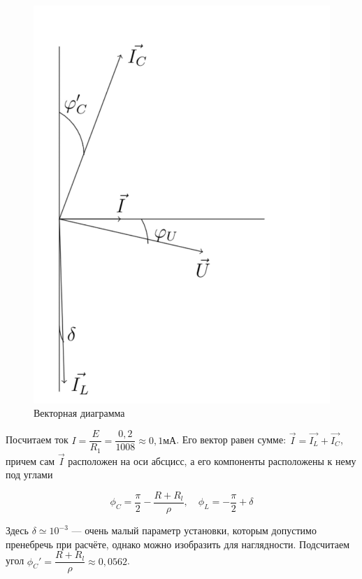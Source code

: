 \documentclass[a4paper, 12pt]{article}
\begin{document}
            \begin{figure}[h!]
                \includegraphics[scale=0.5]{img/vector.png}
                \caption{Векторная диаграмма}
            \end{figure}


            Посчитаем ток $ I = \dfrac{E}{R_1} = \dfrac{0,2}{1008} \approx 0,1 мА $. Его вектор равен сумме: $ \vec{I} = \vec{I_L} + \vec{I_C} $, причем сам $ \vec{I} $ расположен на оси абсцисс, а его компоненты расположены к нему под углами

            \begin{equation}\label{}
            \phi_C = \dfrac{\pi}{2} - \dfrac{R + R_l}{\rho}, \quad \phi_L = -\dfrac{\pi}{2} + \delta
            \end{equation}

            Здесь $ \delta \simeq 10^{-3}$ --- очень малый параметр установки, которым допустимо пренебречь при расчёте, однако можно изобразить для наглядности. Подсчитаем угол $ \phi_C' =   \dfrac{R + R_l}{\rho} \approx 0,0562 $.
\end{document}
